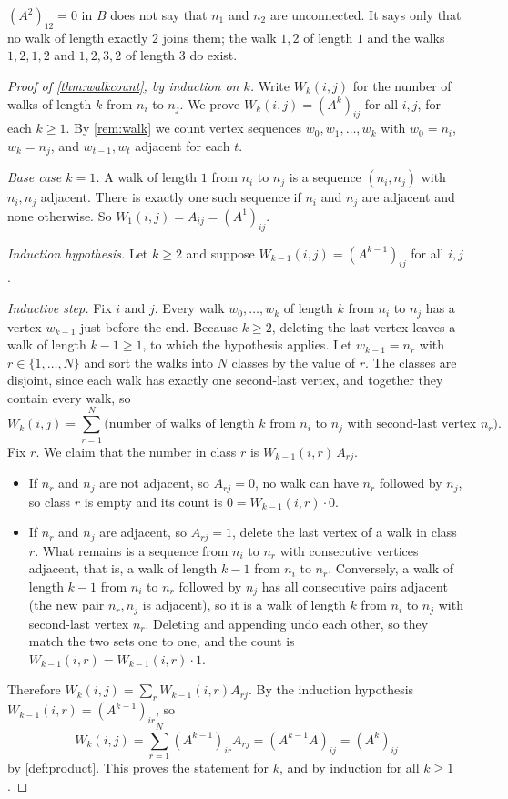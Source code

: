 \begin{nonexample}
$(A^2)_{12}=0$ in $B$ does not say that $n_1$ and $n_2$ are unconnected.
It says only that no walk of length exactly $2$ joins them; the walk $1,2$ of length $1$ and the walks $1,2,1,2$ and $1,2,3,2$ of length $3$ do exist.
\end{nonexample}

\begin{proof}[Proof of \cref{thm:walkcount}, by induction on $k$]
Write $W_k(i,j)$ for the number of walks of length $k$ from $n_i$ to $n_j$.
We prove $W_k(i,j)=(A^k)_{ij}$ for all $i,j$, for each $k\ge 1$.
By \cref{rem:walk} we count vertex sequences $w_0,w_1,\dots,w_k$ with $w_0=n_i$, $w_k=n_j$, and $w_{t-1},w_t$ adjacent for each $t$.

\emph{Base case $k=1$.}
A walk of length $1$ from $n_i$ to $n_j$ is a sequence $(n_i,n_j)$ with $n_i,n_j$ adjacent.
There is exactly one such sequence if $n_i$ and $n_j$ are adjacent and none otherwise.
So $W_1(i,j)=A_{ij}=(A^1)_{ij}$.

\emph{Induction hypothesis.}
Let $k\ge 2$ and suppose $W_{k-1}(i,j)=(A^{k-1})_{ij}$ for all $i,j$.

\emph{Inductive step.}
Fix $i$ and $j$.
Every walk $w_0,\dots,w_k$ of length $k$ from $n_i$ to $n_j$ has a vertex $w_{k-1}$ just before the end.
Because $k\ge 2$, deleting the last vertex leaves a walk of length $k-1\ge 1$, to which the hypothesis applies.
Let $w_{k-1}=n_r$ with $r\in\{1,\dots,N\}$ and sort the walks into $N$ classes by the value of $r$.
The classes are disjoint, since each walk has exactly one second-last vertex, and together they contain every walk, so
\[
W_k(i,j)=\sum_{r=1}^{N}\bigl(\text{number of walks of length }k\text{ from }n_i\text{ to }n_j\text{ with second-last vertex }n_r\bigr).
\]
Fix $r$.
We claim that the number in class $r$ is $W_{k-1}(i,r)\,A_{rj}$.
\begin{itemize}
\item If $n_r$ and $n_j$ are not adjacent, so $A_{rj}=0$, no walk can have $n_r$ followed by $n_j$, so class $r$ is empty and its count is $0=W_{k-1}(i,r)\cdot 0$.
\item If $n_r$ and $n_j$ are adjacent, so $A_{rj}=1$, delete the last vertex of a walk in class $r$.
What remains is a sequence from $n_i$ to $n_r$ with consecutive vertices adjacent, that is, a walk of length $k-1$ from $n_i$ to $n_r$.
Conversely, a walk of length $k-1$ from $n_i$ to $n_r$ followed by $n_j$ has all consecutive pairs adjacent (the new pair $n_r,n_j$ is adjacent), so it is a walk of length $k$ from $n_i$ to $n_j$ with second-last vertex $n_r$.
Deleting and appending undo each other, so they match the two sets one to one, and the count is $W_{k-1}(i,r)=W_{k-1}(i,r)\cdot 1$.
\end{itemize}
Therefore $W_k(i,j)=\sum_{r}W_{k-1}(i,r)A_{rj}$.
By the induction hypothesis $W_{k-1}(i,r)=(A^{k-1})_{ir}$, so
\[
W_k(i,j)=\sum_{r=1}^{N}(A^{k-1})_{ir}A_{rj}=(A^{k-1}A)_{ij}=(A^k)_{ij}
\]
by \cref{def:product}.
This proves the statement for $k$, and by induction for all $k\ge 1$.
\end{proof}

